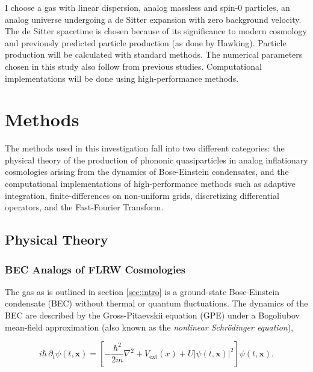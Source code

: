 \documentclass{article}
\begin{document}
\pagebreak
        
    I choose a gas with linear dispersion, analog massless and spin-0 particles, an analog universe undergoing a de Sitter expansion with zero background velocity.  The de Sitter spacetime is chosen because of its significance to modern cosmology and previously predicted particle production (as done by Hawking)\cite{de_Sitter_inhomogeneities, de_Sitter_particle_production_1, de_Sitter_particle_production_2}. Particle production will be calculated with standard methods\cite{particle_production_1, particle_production_2}.  The numerical parameters chosen in this study also follow from previous studies\cite{parameters}.  Computational implementations will be done using high-performance methods.

\section{Methods}

    The methods used in this investigation fall into two different categories: the physical theory of the production of phononic quasiparticles in analog inflationary cosmologies arising from the dynamics of Bose-Einstein condensates, and the computational implementations of high-performance methods such as adaptive integration, finite-differences on non-uniform grids, discretizing differential operators, and the Fast-Fourier Transform.

    \subsection{Physical Theory}

        \subsubsection{BEC Analogs of FLRW Cosmologies}

            The gas as is outlined in section \ref{sec:intro} is a ground-state Bose-Einstein condensate (BEC) without thermal or quantum fluctuations. The dynamics of the BEC are described by the Gross-Pitaevskii equation (GPE) under a Bogoliubov mean-field approximation (also known as the \textit{nonlinear Schr{\"o}dinger equation}),
            
            \begin{equation} \label{eq:GPE}
                i \hbar \, \partial_t \psi(t, \mathbf{x}) = \left[ -\frac{\hbar^2}{2 m} \nabla^2 + V_\text{ext}(x) + U \left| \psi(t, \mathbf{x}) \right|^2 \right] \psi(t, \mathbf{x}).
            \end{equation}
            
\end{document}
